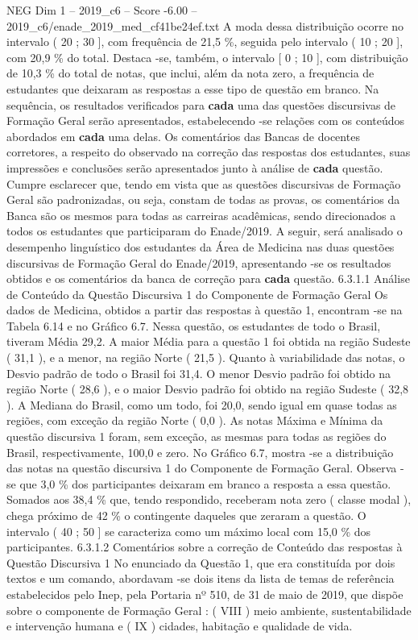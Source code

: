 \begin{textsample}{NEG Dim 1 – 2019\_c6 – Score -6.00 – 2019\_c6/enade\_2019\_med\_cf41be24ef.txt}
A moda dessa distribuição ocorre no intervalo ( 20 ; 30 ], com frequência de 21,5 \%, seguida pelo intervalo ( 10 ; 20 ], com 20,9 \% do total.
Destaca -se, também, o intervalo [ 0 ; 10 ], com distribuição de 10,3 \% do total de notas, que inclui, além da nota zero, a frequência de estudantes que deixaram as respostas a esse tipo de questão em branco.
Na sequência, os resultados verificados para \textbf{cada} uma das questões discursivas de Formação Geral serão apresentados, estabelecendo -se relações com os conteúdos abordados em \textbf{cada} uma delas.
Os comentários das Bancas de docentes corretores, a respeito do observado na correção das respostas dos estudantes, suas impressões e conclusões serão apresentados junto à análise de \textbf{cada} questão.
Cumpre esclarecer que, tendo em vista que as questões discursivas de Formação Geral são padronizadas, ou seja, constam de todas as provas, os comentários da Banca são os mesmos para todas as carreiras acadêmicas, sendo direcionados a todos os estudantes que participaram do Enade/2019.
A seguir, será analisado o desempenho linguístico dos estudantes da Área de Medicina nas duas questões discursivas de Formação Geral do Enade/2019, apresentando -se os resultados obtidos e os comentários da banca de correção para \textbf{cada} questão. 6.3.1.1 Análise de Conteúdo da Questão Discursiva 1 do Componente de Formação Geral Os dados de Medicina, obtidos a partir das respostas à questão 1, encontram -se na Tabela 6.14 e no Gráfico 6.7.
Nessa questão, os estudantes de todo o Brasil, tiveram Média 29,2.
A maior Média para a questão 1 foi obtida na região Sudeste ( 31,1 ), e a menor, na região Norte ( 21,5 ).
Quanto à variabilidade das notas, o Desvio padrão de todo o Brasil foi 31,4.
O menor Desvio padrão foi obtido na região Norte ( 28,6 ), e o maior Desvio padrão foi obtido na região Sudeste ( 32,8 ).
A Mediana do Brasil, como um todo, foi 20,0, sendo igual em quase todas as regiões, com exceção da região Norte ( 0,0 ).
As notas Máxima e Mínima da questão discursiva 1 foram, sem exceção, as mesmas para todas as regiões do Brasil, respectivamente, 100,0 e zero.
No Gráfico 6.7, mostra -se a distribuição das notas na questão discursiva 1 do Componente de Formação Geral.
Observa -se que 3,0 \% dos participantes deixaram em branco a resposta a essa questão.
Somados aos 38,4 \% que, tendo respondido, receberam nota zero ( classe modal ), chega próximo de 42 \% o contingente daqueles que zeraram a questão.
O intervalo ( 40 ; 50 ] se caracteriza como um máximo local com 15,0 \% dos participantes. 6.3.1.2 Comentários sobre a correção de Conteúdo das respostas à Questão Discursiva 1 No enunciado da Questão 1, que era constituída por dois textos e um comando, abordavam -se dois itens da lista de temas de referência estabelecidos pelo Inep, pela Portaria nº 510, de 31 de maio de 2019, que dispõe sobre o componente de Formação Geral : ( VIII ) meio ambiente, sustentabilidade e intervenção humana e ( IX ) cidades, habitação e qualidade de vida.

\end{textsample}
